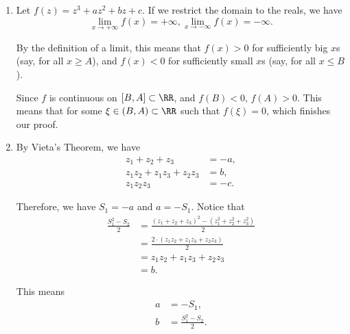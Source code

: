 \Question{\currfilebase}

\begin{enumerate}
    \item Let \(f(z) = z^3 + az^2 + bz + c\). If we restrict the domain to the reals, we have
          \[
              \lim_{x \to +\infty} f(x) = +\infty, \lim_{x \to -\infty} f(x) = -\infty.
          \]

          By the definition of a limit, this means that \(f(x) > 0\) for sufficiently big \(x\)s (say, for all \(x \geq A\)), and \(f(x) < 0\) for sufficiently small \(x\)s (say, for all \(x \leq B\)).

          Since \(f\) is continuous on \([B, A] \subset \RR\), and \(f(B) < 0\), \(f(A) > 0\). This means that for some \(\xi \in (B, A) \subset \RR\) such that \(f(\xi) = 0\), which finishes our proof.

    \item By Vieta's Theorem, we have
          \begin{align*}
              z_1 + z_2 + z_3             & = -a, \\
              z_1 z_2 + z_1 z_3 + z_2 z_3 & = b,  \\
              z_1 z_2 z_3                 & = -c.
          \end{align*}

          Therefore, we have \(S_1 = -a\) and \(a = -S_1\). Notice that
          \begin{align*}
              \frac{S_1^2 - S_2}{2} & = \frac{(z_1 + z_2 + z_3)^2 - (z_1^2 + z_2^2 + z_3^2)}{2} \\
                                    & = \frac{2 \cdot (z_1 z_2 + z_1 z_3 + z_2 z_3)}{2}         \\
                                    & = z_1 z_2 + z_1 z_3 + z_2 z_3                             \\
                                    & = b.
          \end{align*}

          This means
          \begin{align*}
              a & = - S_1,                 \\
              b & = \frac{S_1^2 - S_2}{2}.
          \end{align*}


\end{enumerate}
